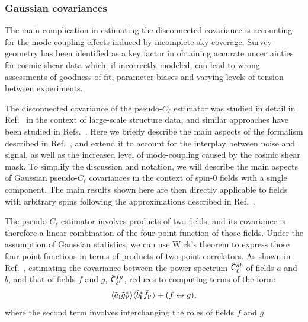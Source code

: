\documentclass[a4paper,11pt]{article}
\begin{document}
      \subsubsection{Gaussian covariances}\label{sssec:pcl.covar.gaussian}
        The main complication in estimating the disconnected covariance is accounting for the mode-coupling effects induced by incomplete sky coverage. Survey geometry has been identified as a key factor in obtaining accurate uncertainties for cosmic shear data \citep{1804.10663} which, if incorrectly modeled, can lead to wrong assessments of goodness-of-fit, parameter biases and varying levels of tension between experiments.
        
        The disconnected covariance of the pseudo-$C_\ell$ estimator was studied in detail in Ref.~\cite{1906.11765} in the context of large-scale structure data, and similar approaches have been studied in Refs.~\cite{astro-ph/0307515,astro-ph/0410394,1609.09730,1811.05714}. Here we briefly describe the main aspects of the formalism described in Ref.~\cite{1906.11765}, and extend it to account for the interplay between noise and signal, as well as the increased level of mode-coupling caused by the cosmic shear mask. To simplify the discussion and notation, we will describe the main aspects of Gaussian pseudo-$C_\ell$ covariances in the context of spin-0 fields with a single component. The main results shown here are then directly applicable to fields with arbitrary spins following the approximations described in Ref.~\cite{1906.11765}.

        The pseudo-$C_\ell$ estimator involves products of two fields, and its covariance is therefore a linear combination of the four-point function of those fields. Under the assumption of Gaussian statistics, we can use Wick's theorem to express those four-point functions in terms of products of two-point correlators. As shown in Ref.~\cite{astro-ph/0307515}, estimating the covariance between the power spectrum $\hat{\sf C}^{ab}_\ell$ of fields $a$ and $b$, and that of fields $f$ and $g$, $\hat{\sf C}^{fg}_{\ell'}$, reduces to computing terms of the form:
        \begin{equation}
          \langle \tilde{a}_{\bf l}\tilde{g}^*_{{\bf l}'}\rangle\langle \tilde{b}^*_{\bf l}\tilde{f}_{{\bf l}'}\rangle+(f\leftrightarrow g),
        \end{equation}
        where the second term involves interchanging the roles of fields $f$ and $g$.
        
\end{document}
